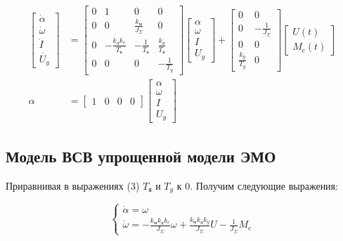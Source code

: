 \documentclass[a4paper, 12pt]{article}
\begin{document}
\begin{align}
    \begin{bmatrix}
        \dot{\alpha} \\
        \dot{\omega} \\
        \dot{I} \\
        \dot{U_y} 
    \end{bmatrix} & = 
    \begin{bmatrix}
        0 & 1 & 0 & 0 \\
        0 & 0 & \frac{k_\text{м}}{J_\Sigma} & 0 \\
        0 & -\frac{k_\text{д}k_e}{T_\text{я}} & - \frac{1}{T_\text{я}} & \frac{k_\text{д}}{T_\text{я}} \\
        0 & 0 & 0 & -\frac{1}{T_y}
    \end{bmatrix}
    \begin{bmatrix}
        \alpha \\
        \omega \\
        I \\
        U_y 
    \end{bmatrix} + 
    \begin{bmatrix}
        0 & 0 \\
        0 & - \frac{1}{J_\Sigma} \\
        0 & 0 \\
        \frac{k_y}{T_y} & 0
    \end{bmatrix}
    \begin{bmatrix}
        U(t) \\
        M_c(t)
    \end{bmatrix} \\
    \alpha & = 
    \begin{bmatrix}
        1 & 0 & 0 & 0
    \end{bmatrix}
    \begin{bmatrix}
        \alpha \\
        \omega \\
        I \\
        U_y 
    \end{bmatrix}
\end{align}

\subsection{Модель ВСВ упрощенной модели ЭМО}
Приравнивая в выражениях (3) $T_\text{я}$ и $T_y$ к 0. Получим следующие выражения:

\begin{equation}
    \begin{cases}
    \dot{\alpha} = \omega \\
    \dot{\omega} = -\frac{k_\text{м}k_\text{д}k_e}{J_\Sigma}\omega + \frac{k_\text{м}k_\text{д}k_y}{J_\Sigma}U - \frac{1}{J_\Sigma}M_c
    \end{cases}
\end{equation}
\end{document}
